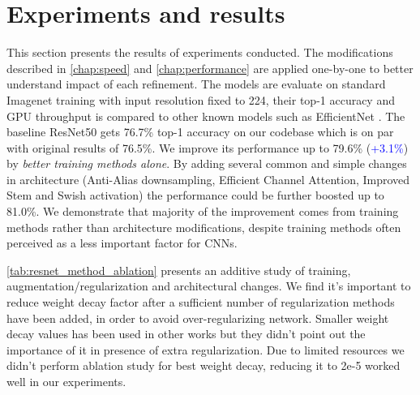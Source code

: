
% 
\chapter{Experiments and results}


This section presents the results of experiments conducted. The modifications described in \autoref{chap:speed} and \autoref{chap:performance} are applied one-by-one to better understand impact of each refinement. The models are evaluate on standard Imagenet training with input resolution fixed to 224, their top-1 accuracy and GPU throughput is compared to other known models such as EfficientNet \cite{tan2019_efficientnet}. The baseline ResNet50 gets 76.7\% top-1 accuracy on our codebase which is on par with original results of 76.5\%. We improve its performance up to 79.6\% (\textcolor{blue}{+3.1\%}) by \textit{better training methods alone}. By adding several common and simple changes in architecture (Anti-Alias downsampling, Efficient Channel Attention, Improved Stem and Swish activation) the performance could be further boosted up to 81.0\%. We demonstrate that majority of the improvement comes from training methods rather than architecture modifications, despite training methods often perceived as a less important factor for CNNs.  

\autoref{tab:resnet_method_ablation} presents an additive study of training, augmentation/regularization and architectural changes. We find it's important to reduce weight decay factor after a sufficient number of regularization methods have been added, in order to avoid over-regularizing network. Smaller weight decay values has been used in other works \cite{tan2019_efficientnet} \cite{bello2021_revisiting_resnet} but they didn't point out the importance of it in presence of extra regularization. Due to limited resources we didn't perform ablation study for best weight decay, reducing it to 2e-5 worked well in our experiments.



